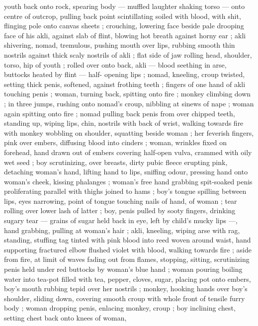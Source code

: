 youth back onto rock, spearing body --- muffled laughter shaking 
torso --- onto centre of outcrop, pulling back point scintillating 
soiled with blood, with shit, flinging pole onto canvas sheets ; 
crouching, lowering face beside pale drooping face of his akli, 
against slab of flint, blowing hot breath against horny ear ; akli 
shivering, nomad, tremulous, pushing mouth over lips, rubbing 
smooth thin nostrils against thick scaly nostrils of akli ; flat side of 
jaw rolling head, shoulder, torso, hip of youth ; rolled over onto back, 
akli --- blood seething in arse, buttocks heated by flint --- half- 
opening lips ; nomad, kneeling, croup twisted, setting thick penis, 
softened, against frothing teeth ; fingers of one hand of akli 
touching penis ; woman, turning back, spitting onto fire ; monkey 
climbing down ; in three jumps, rushing onto nomad's croup, nibbling 
at sinews of nape ; woman again spitting onto fire ; nomad pulling 
back penis from over chipped teeth, standing up, wiping lips, chin, 
nostrils with back of wrist, walking towards fire with monkey wobbling 
on shoulder, squatting beside woman ; her feverish fingers, pink over 
embers, diffusing blood into cinders ; woman, wrinkles fixed on 
forehead, hand drawn out of embers covering half-open vulva, 
crammed with oily wet seed ; boy scrutinizing, over breasts, dirty 
pubic fleece erupting pink, detaching woman's hand, lifting hand to 
lips, sniffing odour, pressing hand onto woman's cheek, kissing 
phalanges ; woman's free hand grabbing spit-soaked penis 
proliferating parallel with thighs joined to hams ; boy's tongue 
spilling between lips, eyes narrowing, point of tongue touching nails 
of hand, of woman ; tear rolling over lower lash of latter ; boy, penis 
pulled by sooty fingers, drinking sugary tear --- grains of sugar held 
back in eye, left by child's mucky lips ---, hand grabbing, pulling at 
woman's hair ; akli, kneeling, wiping arse with rag, standing, stuffing 
tag tinted with pink blood into reed woven around waist, hand 
supporting fractured elbow flushed violet with blood, walking 
towards fire ; aside from fire, at limit of waves fading out from 
flames, stopping, sitting, scrutinizing penis held under red buttocks 
by woman's blue hand ; woman pouring boiling water into tea-pot 
filled with tea, pepper, cloves, sugar, placing pot onto embers, boy's 
mouth rubbing tepid over her nostrils ; monkey, hooking hands over 
boy's shoulder, sliding down, covering smooth croup with whole front 
of tensile furry body ; woman dropping penis, enlacing monkey, 
croup ; boy inclining chest, setting chest back onto knees of woman, 
